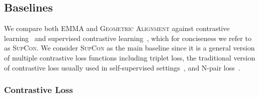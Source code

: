 \documentclass[sigconf,natbib=true,anonymous=true]{acmart}
\newcommand{\ours}{\textsc{EMMA}}
\newcommand{\geom}{\textsc{Geometric Alignment}}
\newcommand{\supcon}{\textsc{SupCon}}
\begin{document}
\subsection{Baselines}
We compare both \ours{} and \geom{} against contrastive learning~\citep{chen2020simple} and supervised contrastive learning~\citep{NEURIPS2020_supervised_contrastive}, which for conciseness we refer to as \supcon{}.
We consider \supcon{} as the main baseline since it is a general version of multiple contrastive loss functions including triplet loss, the traditional version of contrastive loss usually used in self-supervised settings~\citep{chen2020simple}, and N-pair loss~\citep{NIPS2016N-PairLoss}.

\subsubsection{Contrastive Loss}
\label{sub:baseline-contrastive}
\end{document}
